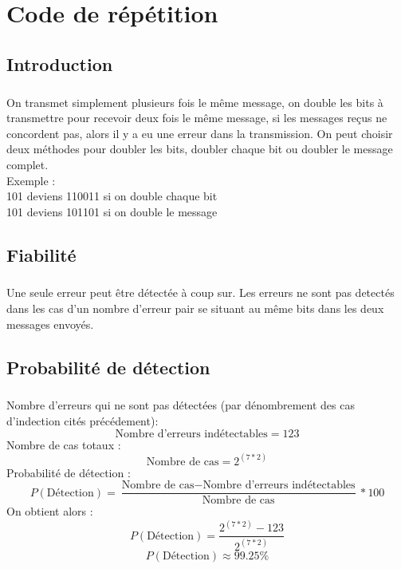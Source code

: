 
\chapter{Code de répétition}

    \section{Introduction}

        \paragraph{}
On transmet simplement plusieurs fois le même message, on double les bits à transmettre pour recevoir deux fois le même message,
si les messages reçus ne concordent pas, alors il y a eu une erreur dans la transmission.
On peut choisir deux méthodes pour doubler les bits, doubler chaque bit ou doubler le message complet.
\\ Exemple :
\\ 101 deviens 110011 si on double chaque bit
\\ 101 deviens 101101 si on double le message


    \clearpage

    \section{Fiabilité}

        \paragraph{}
Une seule erreur peut être détectée à coup sur.
Les erreurs ne sont pas detectés dans les cas d'un nombre d'erreur pair se situant au même bits dans les deux messages envoyés.


    \section{Probabilité de détection}

        \paragraph{}
Nombre d'erreurs qui ne sont pas détectées (par dénombrement des cas d'indection cités précédement):
\[  \text{Nombre d'erreurs indétectables} = 123 \]
Nombre de cas totaux :
\[  \text{Nombre de cas} = 2^{(7*2)} \]
Probabilité de détection :
\[  P(\text{Détection}) = \frac{\text{Nombre de cas} - \text{Nombre d'erreurs indétectables}}{\text{Nombre de cas}}*100 \]
On obtient alors :
\[  P(\text{Détection}) = \frac{2^{(7*2)} - 123}{2^{(7*2)}} \]
\[  P(\text{Détection}) \approx 99.25\% \]


